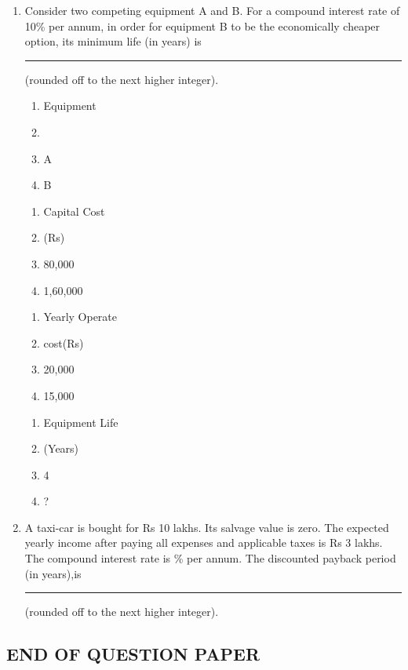 \documentclass[journal,12pt,onecolumn]{IEEEtran}
\theoremstyle{remark}
\begin{document}
\begin{enumerate}
\begin{figure}[H]
\end{figure}

    \item Consider two competing equipment A and B. For a compound interest rate of 10\% per annum, in order for equipment B to be the economically cheaper option, its minimum life (in years) is \rule{1cm}{0.1mm}(rounded off to the next higher integer). 

    \begin{multicols}{4}
    \begin{enumerate}[label = {}]
      \item Equipment
      \item 
      \item A
      \item B
    \end{enumerate}
\columnbreak
    \begin{enumerate}[label = {}]
        \item Capital Cost
        \item (Rs)
        \item 80,000
        \item 1,60,000
    \end{enumerate}
\columnbreak
    \begin{enumerate}[label = {}]
        \item Yearly Operate
        \item cost(Rs)
        \item 20,000
        \item 15,000
    \end{enumerate}
\columnbreak
    \begin{enumerate}[label = {}]
        \item Equipment Life 
        \item (Years)
        \item 4
        \item ?
    \end{enumerate}
    \end{multicols}

    \item A taxi-car is bought for Rs 10 lakhs. Its salvage value is zero. The expected yearly income after paying all expenses and applicable taxes is Rs 3 lakhs. The compound interest rate is \% per annum. The discounted payback period (in years),is \rule{2cm}{0.1mm}(rounded off to the next higher integer). 
\end{enumerate}
    \centering
    \subsection*{END OF QUESTION PAPER}
\end{document}
